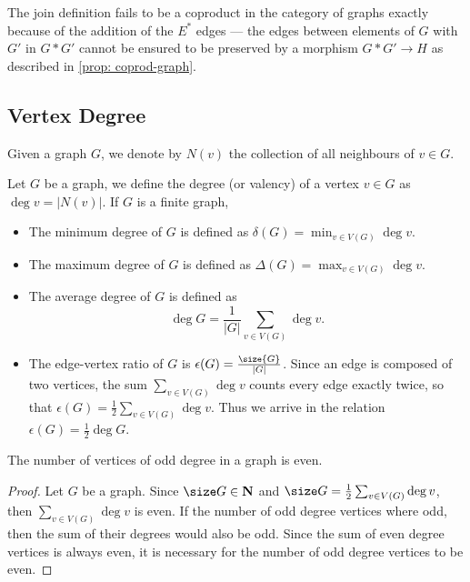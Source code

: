 The join definition fails to be a coproduct in the category of graphs exactly
because of the addition of the \(E^*\) edges --- the edges between elements of
\(G\) with \(G'\) in \(G * G'\) cannot be ensured to be preserved by a morphism
\(G * G' \to H\) as described in \cref{prop: coprod-graph}.

\subsection{Vertex Degree}

\begin{notation}[Neighbourhood]
Given a graph \(G\), we denote by \(N(v)\) the collection of all neighbours of
\(v \in G\).
\end{notation}

\begin{definition}[Degree]\label{def: degree}
Let \(G\) be a graph, we define the degree (or valency) of a vertex \(v \in
G\) as \(\deg v = |N(v)|\). If \(G\) is a finite graph,
\begin{itemize}
  \setlength\itemsep{0em}
  \item The minimum degree of \(G\) is defined as \(\delta(G) = \min_{v \in
    V(G)} \deg v\).
  \item The maximum degree of \(G\) is defined as \(\Delta(G) = \max_{v \in
    V(G)} \deg v\).
  \item The average degree of \(G\) is defined as
    \[
      \deg G = \frac 1 {|G|} \sum_{v \in V(G)} \deg v.
    \]
  \item The edge-vertex ratio of \(G\) is \(\epsilon(G) =
    \frac{\size{G}}{|G|}\). Since an edge is composed of two vertices, the sum
    \(\sum_{v \in V(G)} \deg v\) counts every edge exactly twice, so that
    \(\epsilon(G) = \frac 1 2 \sum_{v \in V(G)} \deg v\). Thus we arrive in
    the relation \(\epsilon(G) = \frac 1 2 \deg G\).
\end{itemize}
\end{definition}

\begin{lemma}\label{lem: handshaking}
The number of vertices of odd degree in a graph is even.
\end{lemma}

\begin{proof}
Let \(G\) be a graph. Since \(\size G \in \N\) and \(\size G = \frac 1 2
\sum_{v \in V(G)} \deg v\), then \(\sum_{v \in V(G)} \deg v\) is even. If the
number of odd degree vertices where odd, then the sum of their degrees would
also be odd. Since the sum of even degree vertices is always even, it is
necessary for the number of odd degree vertices to be even.
\end{proof}

